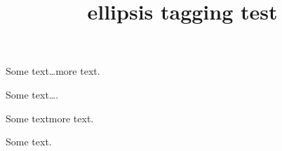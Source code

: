 \documentclass{article}
\title{ellipsis tagging test}
\begin{document}
Some text\dots more text.

Some text\dots.

Some text\textellipsis more text.

Some text\textellipsis.
\end{document}
